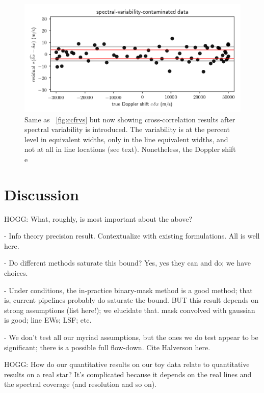 \documentclass[modern]{aastex631}
\newcommand{\figref}[1]{\figurename~\ref{#1}}
\begin{document}
\begin{figure}[tp]
  \begin{mdframed}
    \begin{center}
    \includegraphics[width=\textwidth]{../notebook/variable.png}
    \end{center}
    \caption{Same as \figref{fig:ccfrvs} but now showing cross-correlation results after spectral variability is introduced. The variability is at the percent level in equivalent widths, only in the line equivalent widths, and not at all in line locations (see text). Nonetheless, the Doppler shift e\label{fig:variable}}
  \end{mdframed}
\end{figure}

\section{Discussion}\label{sec:discussion}

HOGG: What, roughly, is most important about the above?

- Info theory precision result. Contextualize with existing formulations. All is well here.

- Do different methods saturate this bound? Yes, yes they can and do; we have choices.

- Under conditions, the in-practice binary-mask method is a good method; that is, current pipelines probably do saturate the bound. BUT this result depends on strong assumptions (list here!); we elucidate that. mask convolved with gaussian is good; line EWs; LSF; etc.

- We don't test all our myriad assumptions, but the ones we do test appear to be significant; there is a possible full flow-down. Cite Halverson here.

HOGG: How do our quantitative results on our toy data relate to quantitative results on a real star? It's complicated because it depends on the real lines and the spectral coverage (and resolution and so on).
\end{document}
